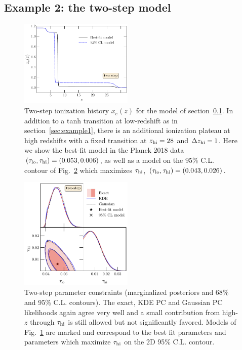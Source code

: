 \documentclass[prd,twocolumn,amsmath,amssymb,floatfix,superscriptaddress,nofootinbib]{revtex4-1}
\newcommand{\refsec}[1]{section~\ref{sec:#1}}
\newcommand{\tauhi}{\tau_{\rm hi}}
\newcommand{\taulo}{\tau_{\rm lo}}
\begin{document}
\subsection{Example 2: the two-step model}
\label{sec:example2}

\begin{figure}
\includegraphics[width=0.48\textwidth]{paper/plots/plot_xe_tanh_highz.pdf}
\caption{Two-step ionization history $x_e(z)$ for the model of \refsec{example2}. In addition to a tanh transition at low-redshift as in \refsec{example1}, there is an additional ionization plateau at high redshifts with a fixed transition at $z_{\rm hi} = 28$ and $\Delta z_{\rm hi} = 1$. Here we show the best-fit model in the Planck 2018 data $(\taulo, \tauhi) = (0.053, 0.006)$, as well as  a model on the 95\% C.L. contour of Fig.~\ref{fig:two_parameter_model_2D} which maximizes $\tauhi$, $(\taulo, \tauhi) = (0.043, 0.026)$. }
\label{fig:two_step_model}
\end{figure}

%
%

\begin{figure}[t]
\includegraphics[width=0.48\textwidth]{paper/plots/pl18_tanh_highz_test7_run1_vs_relike_tanh_highz_test9_run5_f0p14_taulo_prior_0p03_zre_prior_6p1_taulo_prior_0p0_tri.pdf}
\caption{Two-step parameter constraints (marginalized posteriors and 68\% and 95\% C.L. contours).  The exact, KDE PC and Gaussian PC likelihoods again agree very well and a small contribution from high-$z$ through $\tau_{\rm hi}$ is still allowed but not significantly favored.   Models of Fig.~\ref{fig:two_step_model} are marked and correspond to the best fit parameters and parameters 
which maximize $\tau_{\rm hi}$ on the 2D 95\% C.L. contour.
}
\label{fig:two_parameter_model_2D}
\end{figure}
\end{document}
